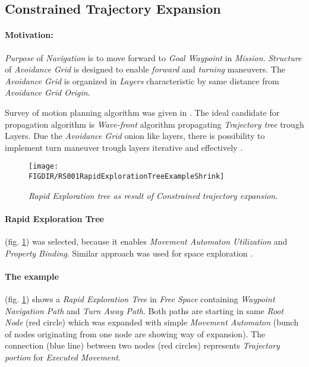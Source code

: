 \subsection{Constrained Trajectory Expansion}\label{s:constrainedTrajectoryExpansion}

\paragraph{Motivation:} \emph{Purpose} of \emph{Navigation} is to move forward to \emph{Goal Waypoint} in \emph{Mission}. \emph{Structure} of \emph{Avoidance Grid} is designed to enable \emph{forward} and \emph{turning} maneuvers. The \emph{Avoidance Grid} is organized in \emph{Layers} characteristic by same distance from \emph{Avoidance Grid Origin}. 

Survey of motion planning algorithm was given in \cite{goerzen2009survey}. The ideal candidate for propagation algorithm is \emph{Wave-front} algorithm propagating \emph{Trajectory tree} trough Layers. Due the \emph{Avoidance Grid} onion like layers, there is possibility to implement turn maneuver trough layers iterative and effectively .

\begin{figure}[H]
    \centering
    \texttt{[image: \\FIGDIR/RS001RapidExplorationTreeExampleShrink]} 
    \caption{\emph{Rapid Exploration tree as result of \emph{Constrained trajectory expansion}}.}
    \label{fig:rapidExplorationTrajectoryTree}
\end{figure}

\paragraph{Rapid Exploration Tree} (fig. \ref{fig:rapidExplorationTrajectoryTree}) was selected, because it enables \emph{Movement Automaton Utilization} and \emph{Property Binding}. Similar approach was used for space exploration \cite{plaisant2002spacetree}. 

\paragraph{The example} (fig. \ref{fig:rapidExplorationTrajectoryTree}) shows a \emph{Rapid Exploration Tree} in \emph{Free Space} containing \emph{Waypoint Navigation Path} and \emph{Turn Away Path}. Both paths are starting in same \emph{Root Node} (red circle) which was expanded with simple \emph{Movement Automaton} (bunch of nodes originating from one node are showing way of expansion). The connection (blue line) between two nodes (red circles) represents \emph{Trajectory portion} for \emph{Executed Movement}.

